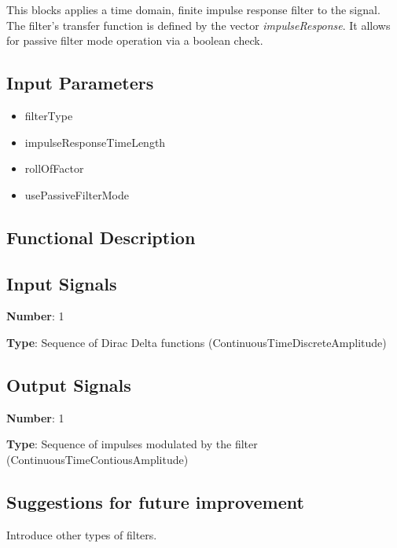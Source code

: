 \documentclass[../../sdf/tex/BPSK_system.tex]{subfiles}
\date{}
\begin{document}
\maketitle

This blocks applies a time domain, finite impulse response filter to the signal. The filter's transfer function is defined by the vector \textit{impulseResponse}. It allows for passive filter mode operation via a boolean check.

\subsection*{Input Parameters}

\begin{itemize}
	\item filterType
	\item impulseResponseTimeLength
	\item rollOfFactor
	\item usePassiveFilterMode
\end{itemize}

\subsection*{Functional Description}

\subsection*{Input Signals}

\textbf{Number}: 1

\textbf{Type}: Sequence of Dirac Delta functions (ContinuousTimeDiscreteAmplitude)

\subsection*{Output Signals}

\textbf{Number}: 1

\textbf{Type}: Sequence of impulses modulated by the filter (ContinuousTimeContiousAmplitude)

\subsection*{Suggestions for future improvement}

Introduce other types of filters.
\end{document}
